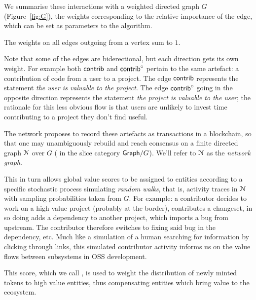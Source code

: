 
We summarise these interactions with a weighted directed graph $G$
(Figure~\ref{fig:G}), the weights corresponding to the relative importance of
the edge, which can be set as parameters to the algorithm.


The weights on all edges outgoing from a vertex sum to $1$.

Note that some of the edges are biderectional, but each direction gets
its own weight. For example both $\mathsf{contrib}$ and $\mathsf{contrib}^\circ$ pertain to
the same artefact: a contribution of code from a user to a
project. The edge $\mathsf{contrib}$ represents the statement \emph{the user
  is valuable to the project}. The edge $\mathsf{contrib}^\circ$ going in the
opposite direction represents the statement \emph{the project is
  valuable to the user}; the rationale for this less obvious flow is
that users are unlikely to invest time contributing to a project they
don't find useful.


The \oscoin{} network proposes to record these artefacts as
transactions in a blockchain, so that one may unambiguously rebuild
and reach consensus on a finite directed graph $\mathcal{N}$ over $G$
(\ie{} in the slice category $\mathsf{Graph}/G$). We'll refer to $\mathcal{N}$
as the \emph{network graph}.

This in turn allows global value scores to be assigned to entities
according to a specific stochastic process simulating \emph{random
  walks}, that is, activity traces in $\mathcal{N}$ with sampling
probabilities taken from $G$. For example: a contributor decides to
work on a high value project (probably at the border), contributes a
changeset, in so doing adds a dependency to another project, which imports a
bug from upstream. The contributor therefore switches to fixing said
bug in the dependency, etc. Much like a simulation of a human
searching for information by clicking through links, this simulated
contributor activity informs us on the value flows between subsystems
in OSS development.

This score, which we call \osrank{}, is used to weight the
distribution of newly minted tokens to high value entities, thus
compensating entities which bring value to the ecosystem.

